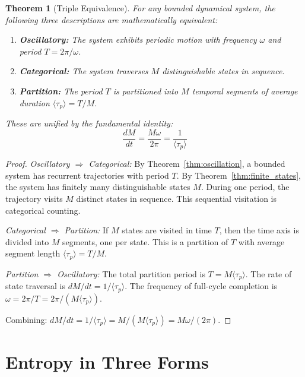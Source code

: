 \documentclass[twocolumn,10pt,a4paper]{article}
\theoremstyle{plain}
\newtheorem{theorem}{Theorem}[section]
\theoremstyle{definition}
\theoremstyle{remark}
\newcommand{\taup}{\tau_p}
\begin{document}
\begin{theorem}[Triple Equivalence]
\label{thm:triple}
For any bounded dynamical system, the following three descriptions are mathematically equivalent:
\begin{enumerate}
    \item \textbf{Oscillatory:} The system exhibits periodic motion with frequency $\omega$ and period $T = 2\pi/\omega$.
    \item \textbf{Categorical:} The system traverses $M$ distinguishable states in sequence.
    \item \textbf{Partition:} The period $T$ is partitioned into $M$ temporal segments of average duration $\langle\taup\rangle = T/M$.
\end{enumerate}
These are unified by the \emph{fundamental identity}:
\begin{equation}
\label{eq:fundamental_identity}
    \frac{dM}{dt} = \frac{M\omega}{2\pi} = \frac{1}{\langle\taup\rangle}
\end{equation}
\end{theorem}

\begin{proof}
\emph{Oscillatory $\Rightarrow$ Categorical:} By Theorem~\ref{thm:oscillation}, a bounded system has recurrent trajectories with period $T$. By Theorem~\ref{thm:finite_states}, the system has finitely many distinguishable states $M$. During one period, the trajectory visits $M$ distinct states in sequence. This sequential visitation is categorical counting.

\emph{Categorical $\Rightarrow$ Partition:} If $M$ states are visited in time $T$, then the time axis is divided into $M$ segments, one per state. This is a partition of $T$ with average segment length $\langle\taup\rangle = T/M$.

\emph{Partition $\Rightarrow$ Oscillatory:} The total partition period is $T = M\langle\taup\rangle$. The rate of state traversal is $dM/dt = 1/\langle\taup\rangle$. The frequency of full-cycle completion is $\omega = 2\pi/T = 2\pi/(M\langle\taup\rangle)$.

Combining: $dM/dt = 1/\langle\taup\rangle = M/(M\langle\taup\rangle) = M\omega/(2\pi)$.
\end{proof}

\section{Entropy in Three Forms}
\label{sec:entropy}
\end{document}
